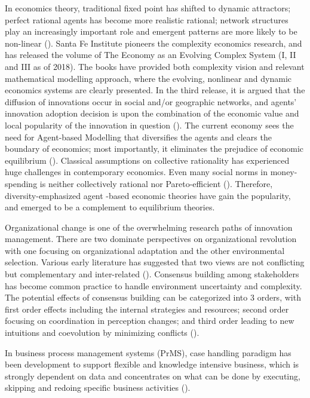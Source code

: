 \documentclass[utf8,english]{gradu3}
\begin{document}
In economics theory, traditional fixed point has shifted to dynamic attractors; perfect rational agents has become more realistic rational; network structures play an increasingly important role and emergent patterns are more likely to be non-linear (\cite{beinhocker2006origin}). Santa Fe Institute pioneers the complexity economics research, and has released the volume of The Economy as an Evolving Complex System (I, II and III as of 2018). The books have provided both complexity vision and relevant mathematical modelling approach, where the evolving, nonlinear and dynamic economics systems are clearly presented. In the third release, it is argued that the diffusion of innovations occur in social and/or geographic networks, and agents' innovation adoption decision is upon the combination of the economic value and local popularity of the innovation in question (\cite{young2006diffusion}). The current economy sees the need for Agent-based Modelling that diversifies the agents and clears the boundary of economics; most importantly, it eliminates the prejudice of economic equilibrium (\cite{farmer2009economy}). Classical assumptions on collective rationality has experienced huge challenges in contemporary economics. Even many social norms  in money-spending is neither collectively rational nor Pareto-efficient (\cite{elster1989social}). Therefore, diversity-emphasized agent -based economic theories have gain the popularity, and emerged to be a complement to equilibrium theories. 

Organizational change is one of the overwhelming research paths of innovation management. There are two dominate perspectives on organizational revolution with one focusing on organizational adaptation and the other environmental selection. Various early literature has suggested that two views are not conflicting but complementary and inter-related (\cite{levinthal1991organizational}). Consensus building among stakeholders has become common practice to handle environment uncertainty and complexity. The potential effects of consensus building can be categorized into 3 orders, with first order effects including the internal strategies and resources; second order focusing on coordination in perception changes; and third order leading to new intuitions and coevolution by minimizing conflicts (\cite{innes1999consensus}).

In business process management systems (PrMS), case handling paradigm has been development to support flexible and knowledge intensive business, which is strongly dependent on data and concentrates on what can be done by executing, skipping and redoing specific business activities (\cite{van2005case}).
\end{document}
